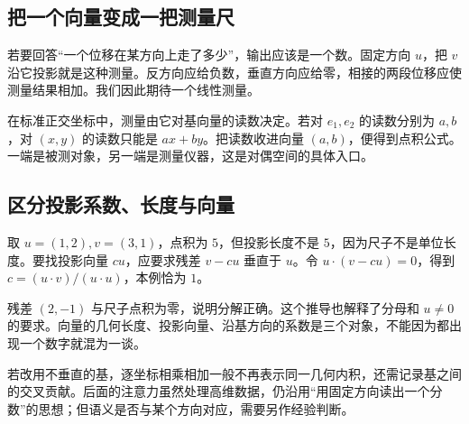 \subsection*{把一个向量变成一把测量尺}
若要回答“一个位移在某方向上走了多少”，输出应该是一个数。固定方向 $u$，把 $v$ 沿它投影就是这种测量。反方向应给负数，垂直方向应给零，相接的两段位移应使测量结果相加。我们因此期待一个线性测量。

在标准正交坐标中，测量由它对基向量的读数决定。若对 $e_1,e_2$ 的读数分别为 $a,b$，对 $(x,y)$ 的读数只能是 $ax+by$。把读数收进向量 $(a,b)$，便得到点积公式。一端是被测对象，另一端是测量仪器，这是对偶空间的具体入口。

\subsection*{区分投影系数、长度与向量}
取 $u=(1,2),v=(3,1)$，点积为 $5$，但投影长度不是 $5$，因为尺子不是单位长度。要找投影向量 $cu$，应要求残差 $v-cu$ 垂直于 $u$。令 $u\cdot(v-cu)=0$，得到 $c=(u\cdot v)/(u\cdot u)$，本例恰为 $1$。

残差 $(2,-1)$ 与尺子点积为零，说明分解正确。这个推导也解释了分母和 $u\ne0$ 的要求。向量的几何长度、投影向量、沿基方向的系数是三个对象，不能因为都出现一个数字就混为一谈。

若改用不垂直的基，逐坐标相乘相加一般不再表示同一几何内积，还需记录基之间的交叉贡献。后面的注意力虽然处理高维数据，仍沿用“用固定方向读出一个分数”的思想；但语义是否与某个方向对应，需要另作经验判断。
